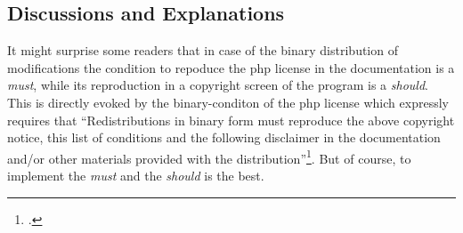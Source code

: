 \subsection{Discussions and Explanations}

\label{sec:PhpDiscussions}

It might surprise some readers that in case of the binary distribution of
modifications the condition to repoduce the php license in the documentation is
a \emph{must}, while its reproduction in a copyright screen of the program is a
\emph{should}. This is directly evoked by the binary-conditon of the php license
which expressly requires that \enquote{Redistributions in binary form must
reproduce the above copyright notice, this list of conditions and the following
disclaimer in the documentation and/or other materials provided with the
distribution}\footcite[cf.][wp. §2]{Php30OsiLicense2013a}. But of course, to
implement the \emph{must} and the \emph{should} is the best.

%
